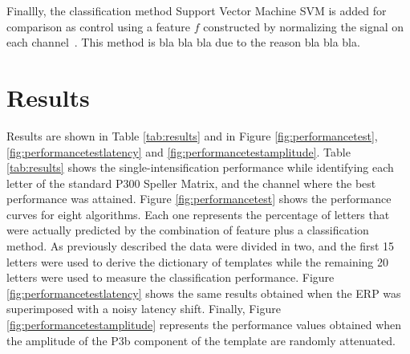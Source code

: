 \documentclass[brainsci,article,submit,moreauthors,pdftex,10pt,a4paper]{mdpi}
\begin{document}
Finallly, the classification method Support Vector Machine SVM is added for comparison as control using a feature $f$ constructed by normalizing the signal on each channel~\citep{Krusienski2006}.  This method is bla bla bla due to the reason bla bla bla.

\section{Results}
\label{section:results}

Results are shown in Table \ref{tab:results} and in Figure \ref{fig:performancetest},\ref{fig:performancetestlatency} and \ref{fig:performancetestamplitude}.  Table \ref{tab:results} shows the single-intensification performance while identifying each letter of the standard P300 Speller Matrix, and the channel where the best performance was attained.   Figure \ref{fig:performancetest} shows the performance curves for eight algorithms.  Each one represents the percentage of letters that were actually predicted by the combination of feature plus a classification method.  As previously described the data were divided in two, and the first 15 letters were used to derive the dictionary of templates while the remaining 20 letters were used to measure the classification performance.   Figure \ref{fig:performancetestlatency} shows the same results obtained when the ERP was superimposed with a noisy latency shift.   Finally, Figure \ref{fig:performancetestamplitude} represents the performance values obtained when the amplitude of the P3b component of the template are randomly attenuated.
\end{document}

